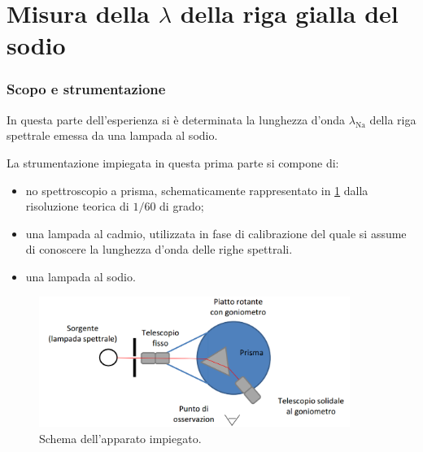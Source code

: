 \part{Misura della $\lambda$ della riga gialla del sodio}
\section{Scopo e strumentazione}
	In questa parte dell'esperienza si è determinata la lunghezza d’onda $\lambda_{\text{Na}}$ della riga spettrale emessa da una lampada al sodio.

	La strumentazione impiegata in questa prima parte si compone di:
	\begin{itemize}
		\item no spettroscopio a	prisma, schematicamente rappresentato in \figurename{ \ref{fig:prisma}} dalla risoluzione teorica di $1/60$ di grado;
		\item una lampada al cadmio, utilizzata in fase di calibrazione del quale si assume di conoscere la lunghezza d'onda delle righe spettrali.
		\item una lampada al sodio.
	\end{itemize}

	\begin{figure} [H]
		\centering
		\includegraphics[width=0.9\textwidth]{../Figs-tabs/prisma}
		\caption{Schema dell'apparato impiegato.}
		\label{fig:prisma}
	\end{figure}
